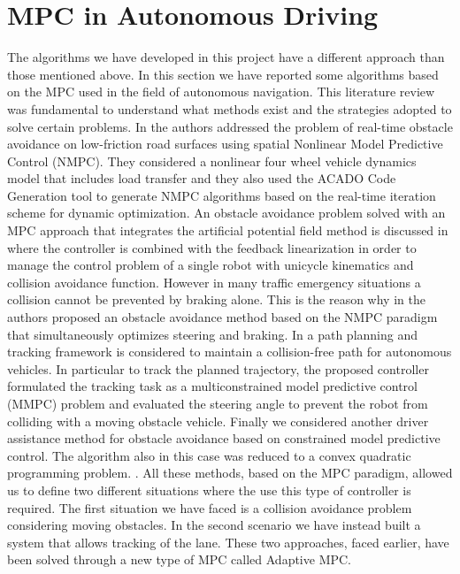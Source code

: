 \section{MPC in Autonomous Driving}
The algorithms we have developed in this project have a different approach than those mentioned above. In this section we have reported some algorithms based on the MPC used in the field of autonomous navigation. This literature review was fundamental to understand what methods exist and the strategies adopted to solve certain problems.
In \cite{Frasch2013} the authors addressed the problem of real-time obstacle avoidance on low-friction road surfaces using spatial Nonlinear Model Predictive Control (NMPC). They considered a nonlinear four wheel vehicle dynamics model that includes load transfer and they also used the ACADO Code Generation tool to generate NMPC algorithms based on the real-time iteration scheme for dynamic optimization. An obstacle avoidance problem solved with an MPC approach that integrates the artificial potential field method is discussed in \cite{Manzoor2015} where the controller is combined with the feedback linearization in order to manage the control problem of a single robot with unicycle kinematics and collision avoidance function. However in many traffic emergency situations a collision cannot be prevented by braking alone. This is the reason why in \cite{Werling2012} the authors proposed an obstacle avoidance method based on the NMPC paradigm that simultaneously optimizes steering and braking. In \cite{Multi2017} a path planning and tracking framework is considered to maintain a collision-free path for autonomous vehicles. In particular to track the planned
trajectory, the proposed controller formulated the tracking task as a multiconstrained model predictive control (MMPC) problem and evaluated the steering angle to prevent the robot  from colliding with a moving obstacle vehicle. Finally we considered another driver assistance method for obstacle avoidance based on constrained model predictive control. The algorithm also in this case was reduced to a convex quadratic programming problem. \cite{Wada2017}. All these methods, based on the MPC paradigm, allowed us to define two different situations where the use this type of controller is required. The first situation we have faced is a collision avoidance problem considering moving obstacles. In the second scenario we have instead built a system that allows tracking of the lane. These two approaches, faced earlier, have been solved through a new type of MPC called Adaptive MPC.